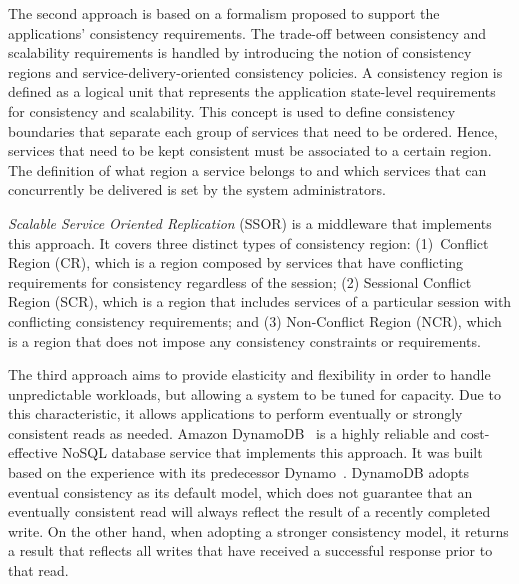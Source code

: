 The second approach is based on a formalism proposed to support the applications’ consistency requirements. The trade-off between consistency and scalability requirements is handled by introducing the notion of consistency regions and service-delivery-oriented consistency policies. A consistency region is defined as a logical unit that represents the application state-level requirements for consistency and scalability. This concept is used to define consistency boundaries that separate each group of services that need to be ordered. Hence, services that need to be kept consistent must be associated to a certain region. The definition of what region a service belongs to and which services that can concurrently be delivered is set by the system administrators. 

\textit{Scalable Service Oriented Replication} (SSOR) \cite{Chen:2014} is a middleware that implements this approach. %
It covers three distinct types of consistency region: (1)~Conflict Region (CR), which is a region composed by services that have conflicting requirements for consistency regardless of the session; (2) Sessional Conflict Region (SCR), which is a region that includes services of a particular session with conflicting consistency requirements; and (3) Non-Con\-flict Region (NCR), which is a region that does not impose any consistency constraints or requirements.

The third approach aims to provide elasticity and flexibility in order to handle unpredictable workloads, but allowing a system to be tuned for capacity. Due to this characteristic, it allows applications to perform eventually or strongly consistent reads as needed. Amazon DynamoDB~\cite{sivasubramanian2012amazon} is a highly reliable and cost-effective NoSQL database service that implements this  approach. %
It was built based on the experience with its predecessor Dynamo~\cite{decandia2007dynamo}. DynamoDB adopts %
eventual consistency as its default model, which does not guarantee that an eventually consistent read will always reflect the result of a recently completed write. On the other hand, when adopting a stronger consistency model, it returns a result that reflects all writes that have received a successful response prior to that read. \\

